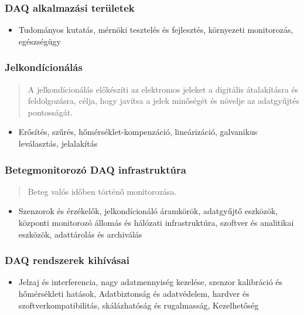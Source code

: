 \subsubsection{DAQ alkalmazási területek}
\begin{itemize}
    \item Tudományos kutatás, mérnöki tesztelés és fejlesztés, környezeti monitorozás, egészségügy
\end{itemize}

\subsubsection{Jelkondícionálás}
\begin{quote}
    A jelkondícionálás előkészíti az elektromos jeleket a digitális átalakításra és feldolgozásra, célja, hogy javítsa a jelek minőségét és növelje az adatgyűjtés pontosságát.
\end{quote}
\begin{itemize}
    \item Erősítés, szűrés, hőmérséklet-kompenzáció, lineárizáció, galvanikus leválasztás, jelalakítás
\end{itemize}

\subsubsection{Betegmonitorozó DAQ infrastruktúra}
\begin{quote}
    Beteg valós időben történő monitorozása.
\end{quote}
\begin{itemize}
    \item Szenzorok és érzékelők, jelkondícionáló áramkörök, adatgyűjtő eszközök, központi monitorozó állomás és hálózati infrastruktúra, szoftver és analitikai eszközök, adattárolás és archiválás
\end{itemize}

\subsubsection{DAQ rendszerek kihívásai}
\quote
\begin{itemize}
    \item Jelzaj és interferencia, nagy adatmennyiség kezelése, szenzor kalibráció és hőmérsékleti hatások, Adatbiztonság és adatvédelem, hardver és szoftverkompatibilitás, skálázhatóság és rugalmasság, Kezelhetőség 
\end{itemize}

